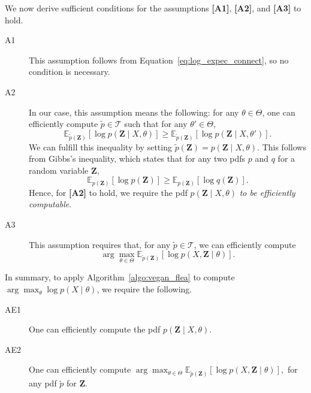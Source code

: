 We now derive sufficient conditions for the assumptions \textbf{[A1]}, \textbf{[A2]}, and \textbf{[A3]} to hold. 
%
\begin{description}
\item[A1] This assumption follows from Equation~\ref{eq:log_expec_connect}, so no condition is necessary.

\item[A2] In our case, this assumption means the following: for any $\theta \in \Theta$, one can efficiently compute $\tilde{p} \in \mathcal{T}$ such that for any $\theta' \in \Theta$, 
%
\begin{equation}
\mathbb{E}_{\tilde{p}\left(\mathbf{Z}\right)}\left[\log p(\mathbf{Z} \mid X, \theta)\right] \geq \mathbb{E}_{\tilde{p}\left(\mathbf{Z}\right)}\left[\log p(\mathbf{Z} \mid X, \theta')\right].
\label{eq:e_step_req_instan}
\end{equation}
%
We can fulfill this inequality by setting $\tilde{p}\left(\mathbf{Z}\right) = p(\mathbf{Z} \mid X, \theta)$. This follows from Gibbs's inequality, which states that for any two pdfs $p$ and $q$ for a random variable $\mathbf{Z}$,
%
\begin{equation}
\mathbb{E}_{p\left(\mathbf{Z}\right)}\left[\log p(\mathbf{Z})\right] \geq \mathbb{E}_{p\left(\mathbf{Z}\right)}\left[\log q(\mathbf{Z})\right].
\label{eq:gibbs_inequality}
\end{equation}
%
Hence, for \textbf{[A2]} to hold, we require the pdf $p(\mathbf{Z} \mid X, \theta)$ \emph{to be efficiently computable}.

\item[A3] This assumption requires that, for any $\tilde{p} \in \mathcal{T}$, we can efficiently compute
%
$$\arg\max_{\theta \in \Theta} \mathbb{E}_{\tilde{p}\left(\mathbf{Z}\right)}\left[\log p(X, \mathbf{Z} \mid \theta)\right].$$
%
\end{description}

In summary, to apply Algorithm~\ref{algo:vegan_flea} to compute $\arg\max_\theta \log p\left(X \mid \theta\right)$, we require the following.

\begin{description}
\item[AE1] One can efficiently compute the pdf $p(\mathbf{Z} \mid X, \theta)$.
\item[AE2] One can efficiently compute 
%
$\arg\max_{\theta \in \Theta} \mathbb{E}_{\tilde{p}\left(\mathbf{Z}\right)}\left[\log p(X, \mathbf{Z} \mid \theta)\right],$
%
for any pdf $\tilde{p}$ for $\mathbf{Z}$.
\end{description}

